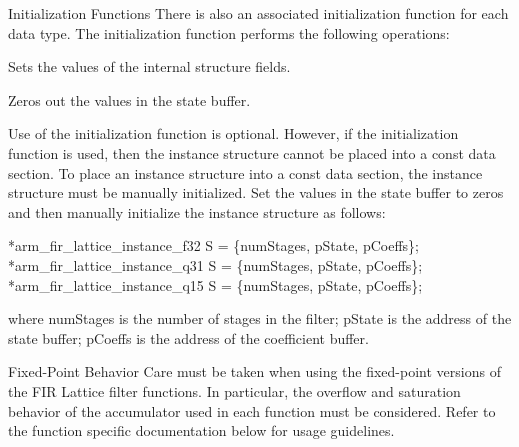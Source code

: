 \begin{DoxyParagraph}{Initialization Functions }
There is also an associated initialization function for each data type. The initialization function performs the following operations\-:
\begin{DoxyItemize}
\item Sets the values of the internal structure fields.
\item Zeros out the values in the state buffer.
\end{DoxyItemize}
\end{DoxyParagraph}
\begin{DoxyParagraph}{}
Use of the initialization function is optional. However, if the initialization function is used, then the instance structure cannot be placed into a const data section. To place an instance structure into a const data section, the instance structure must be manually initialized. Set the values in the state buffer to zeros and then manually initialize the instance structure as follows\-: 
\begin{DoxyPre}    
*arm\_fir\_lattice\_instance\_f32 S = \{numStages, pState, pCoeffs\};    
*arm\_fir\_lattice\_instance\_q31 S = \{numStages, pState, pCoeffs\};    
*arm\_fir\_lattice\_instance\_q15 S = \{numStages, pState, pCoeffs\};    
  \end{DoxyPre}
 
\end{DoxyParagraph}
\begin{DoxyParagraph}{}
where {\ttfamily num\-Stages} is the number of stages in the filter; {\ttfamily p\-State} is the address of the state buffer; {\ttfamily p\-Coeffs} is the address of the coefficient buffer. 
\end{DoxyParagraph}
\begin{DoxyParagraph}{Fixed-\/\-Point Behavior }
Care must be taken when using the fixed-\/point versions of the F\-I\-R Lattice filter functions. In particular, the overflow and saturation behavior of the accumulator used in each function must be considered. Refer to the function specific documentation below for usage guidelines. 
\end{DoxyParagraph}


